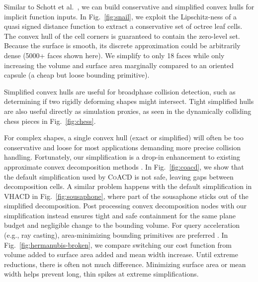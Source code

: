 \documentclass{egpubl}
\begin{document}
Similar to Schott et al.~\cite{Schott25}, we can build conservative and simplified convex hulls for implicit function inputs.
In Fig.~\ref{fig:snail}, we exploit the Lipschitz-ness of a quasi signed distance function to extract a conservative set of octree leaf cells.
The convex hull of the cell corners is guaranteed to contain the zero-level set.
Because the surface is smooth, its discrete approximation could be arbitrarily dense (5000+ faces shown here). We simplify to only 18 faces while only increasing the volume and surface area marginally compared to an oriented capsule (a cheap but loose bounding primitive).



Simplified convex hulls are useful for broadphase collision detection, such as determining if two rigidly deforming shapes might intersect.
Tight simplified hulls are also useful directly as simulation proxies, as seen in the dynamically colliding chess pieces in Fig.~\ref{fig:chess}.


For complex shapes, a single convex hull (exact or simplified) will often be too conservative and loose for most applications demanding more precise collision handling.
Fortunately, our simplification is a drop-in enhancement to existing approximate convex decomposition methods \cite{Mamou2016,wei2022coacd}.
In Fig.~\ref{fig:coacd}, we show that the default simplification used by \textsc{CoACD} \cite{wei2022coacd} is not safe, leaving gaps between decomposition cells.
A similar problem happens with the default simplification in \textsc{VHACD} \cite{Mamou2016} in Fig.~\ref{fig:sousaphone}, where part of the sousaphone sticks out of the simplified decomposition.
Post processing convex decomposition nodes with our simplification instead ensures tight and safe containment for the same plane budget and negligible change to the bounding volume.
For query acceleration (e.g., ray casting), area-minimizing bounding primitives are preferred \cite{PBRT3e}.
In Fig.~\ref{fig:hermanubis-broken}, we compare switching our cost function from volume added to surface area added and mean width increase.
Until extreme reductions, there is often not much difference. Minimizing surface area or mean width helps prevent long, thin spikes at extreme simplifications.
\end{document}
